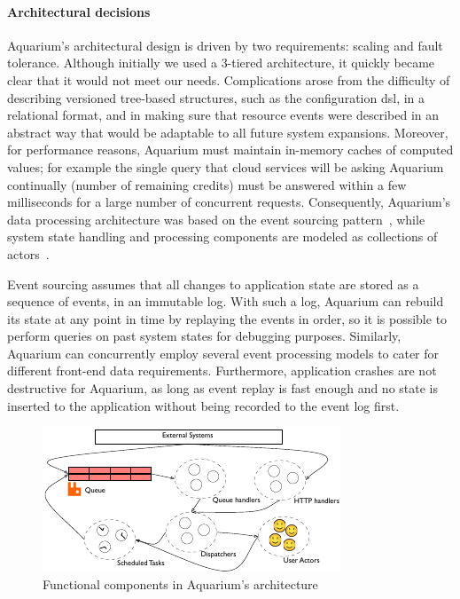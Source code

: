 \paragraph{Architectural decisions} 

Aquarium's architectural design is driven by two requirements: scaling
and fault tolerance. Although initially we used a 3-tiered
architecture, it quickly became clear that it would not meet our
needs. Complications arose from the difficulty of describing versioned
tree-based structures, such as the configuration {\sc dsl}, in a
relational format, and in making sure that resource events were
described in an abstract way that would be adaptable to all future
system expansions. Moreover, for performance reasons, Aquarium must
maintain in-memory caches of computed values; for example the single
query that cloud services will be asking Aquarium continually (number
of remaining credits) must be answered within a few milliseconds for a
large number of concurrent requests. Consequently, Aquarium's data
processing architecture was based on the event sourcing
pattern~\cite{Fowle05}, while system state handling and processing
components are modeled as collections of actors~\cite{Hewit73}.

Event sourcing assumes that all changes to application state are
stored as a sequence of events, in an immutable log. With such a log,
Aquarium can rebuild its state at any point in time by replaying the
events in order, so it is possible to perform queries on past system
states for debugging purposes. Similarly, Aquarium can concurrently
employ several event processing models to cater for different
front-end data requirements. Furthermore, application crashes are not
destructive for Aquarium, as long as event replay is fast enough and
no state is inserted to the application without being recorded to the
event log first.

\begin{figure}
    \begin{center}
    \includegraphics[scale=1.2]{arch.pdf}
    \end{center}
\caption{Functional components in Aquarium's architecture} 
\label{fig:arch}
\end{figure}

